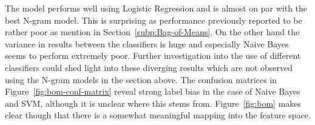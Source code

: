 The model performs well using Logistic Regression and is almost on par with the best N-gram model. This is surprising as performance previously reported to be rather poor as mention in Section~\ref{subp:Bag-of-Means}. On the other hand the variance in results between the classifiers is huge and especially Naive Bayes seems to perform extremely poor. Further investigation into the use of different classifiers could shed light into these diverging results which are not observed using the N-gram models in the section above. The confusion matrices in Figure~\ref{fig:bom-conf-matrix} reveal strong label bias in the case of Naive Bayes and SVM, although it is unclear where this stems from. Figure~\ref{fig:bom} makes clear though that there is a somewhat meaningful mapping into the feature space. 

